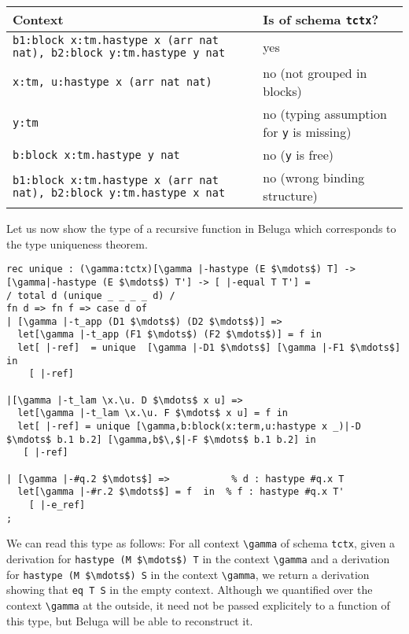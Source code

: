 \begin{center}
\begin{tabular}{p{7.5cm}|p{8cm}}
\hspace{2cm}Context & \hspace{1.5cm}Is of schema \lstinline!tctx!?\\
\hline
\lstinline!b1:block x:tm.hastype x (arr nat nat), b2:block y:tm.hastype y nat!
& yes \\ \hline
\lstinline!x:tm, u:hastype x (arr nat nat)! & no (not grouped in blocks)
\\\hline
\lstinline!y:tm! & no (typing assumption for \lstinline!y! is
missing) \\\hline
\lstinline!b:block x:tm.hastype y nat! & no (\lstinline!y! is free) \\
\hline
\lstinline!b1:block x:tm.hastype x (arr nat nat), b2:block y:tm.hastype x nat!
& no (wrong binding structure)
\end{tabular}
\end{center}



Let us now show the type of a recursive function in Beluga which
corresponds to the type uniqueness theorem.


\begin{lstlisting}[caption={Type Uniqueness Proof},label=list:8-6,captionpos=b,float,abovecaptionskip=-\medskipamount]
rec unique : (\gamma:tctx)[\gamma |-hastype (E $\mdots$) T] -> [\gamma|-hastype (E $\mdots$) T'] -> [ |-equal T T'] =
/ total d (unique _ _ _ _ d) /
fn d => fn f => case d of
| [\gamma |-t_app (D1 $\mdots$) (D2 $\mdots$)] =>
  let[\gamma |-t_app (F1 $\mdots$) (F2 $\mdots$)] = f in
  let[ |-ref]  = unique  [\gamma |-D1 $\mdots$] [\gamma |-F1 $\mdots$] in
    [ |-ref]

|[\gamma |-t_lam \x.\u. D $\mdots$ x u] =>
  let[\gamma |-t_lam \x.\u. F $\mdots$ x u] = f in
  let[ |-ref] = unique [\gamma,b:block(x:term,u:hastype x _)|-D $\mdots$ b.1 b.2] [\gamma,b$\,$|-F $\mdots$ b.1 b.2] in
   [ |-ref]

| [\gamma |-#q.2 $\mdots$] =>           % d : hastype #q.x T
  let[\gamma |-#r.2 $\mdots$] = f  in  % f : hastype #q.x T'
    [ |-e_ref]
;
\end{lstlisting}


We can read this type as follows: For all context \lstinline!\gamma! of
schema \lstinline!tctx!, given a derivation for
\lstinline!hastype (M $\mdots$) T! in the context \lstinline!\gamma! and a derivation for
\lstinline!hastype (M $\mdots$) S! in the context \lstinline!\gamma!, we return a
derivation showing that \lstinline!eq T S! in the empty context.
Although we quantified over the context \lstinline!\gamma! at the outside,
it need not be passed explicitely to a function of this type, but
Beluga will be able to reconstruct it.

